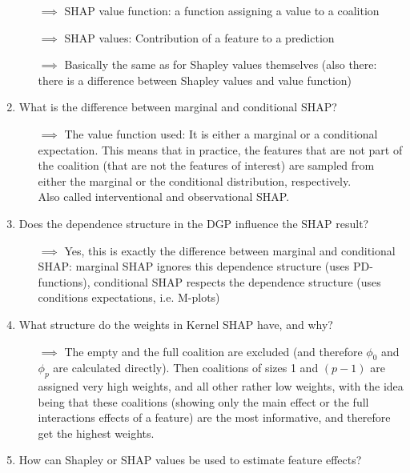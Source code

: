 \begin{enumerate}
\begin{itemize}
    	\item[$\implies$] SHAP value function: a function assigning a value to a coalition
    	\item[$\implies$] SHAP values: Contribution of a feature to a prediction
        \item[$\implies$] Basically the same as for Shapley values themselves (also there: there is a difference between Shapley values and value function)
    \end{itemize}
    \item What is the difference between marginal and conditional SHAP?
    \begin{itemize}
        \item[$\implies$] The value function used: It is either a marginal or a conditional expectation. This means that in practice, the features that are not part of the coalition (that are not the features of interest) are sampled from either the marginal or the conditional distribution, respectively. \\
        Also called interventional and observational SHAP.
    \end{itemize}
    \item Does the dependence structure in the DGP influence the SHAP result?
    \begin{itemize}
        \item[$\implies$] Yes, this is exactly the difference between marginal and conditional SHAP: marginal SHAP ignores this dependence structure (uses PD-functions), conditional SHAP respects the dependence structure (uses conditions expectations, i.e. M-plots)
    \end{itemize}
    \item What structure do the weights in Kernel SHAP have, and why?
    \begin{itemize}
        \item[$\implies$] The empty and the full coalition are excluded (and therefore $\phi_0$ and $\phi_{p}$ are calculated directly). Then coalitions of sizes 1 and $(p-1)$ are assigned very high weights, and all other rather low weights, with the idea being that these coalitions (showing only the main effect or the full interactions effects of a feature) are the most informative, and therefore get the highest weights.
    \end{itemize}
    \item How can Shapley or SHAP values be used to estimate feature effects?

\end{enumerate}

